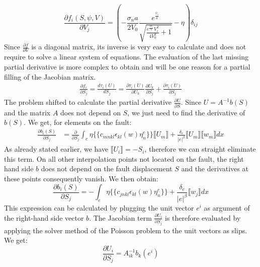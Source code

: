 \begin{equation}
\frac{\partial f_i(S,\psi,V)}{\partial V_j} = \left( -\frac{\sigma_na}{2V_0} \frac{e^{\frac{\psi_i}{a}}}{\sqrt{\frac{e^{\frac{2\psi_i}{a}}V_i^2}{4V_0^2}+1}}-\eta\right)\delta_{ij} 
\label{eq:partial_df_dV}
\end{equation}
Since $\frac{\partial f}{\partial V}$ is a diagonal matrix, its inverse is very easy to calculate and does not require to solve a linear system of equations. The evaluation of the last missing partial derivative is more complex to obtain and will be one reason for a partial filling of the Jacobian matrix.
\begin{align}
\label{eq:partialDerivative_df_dS}
\frac{\partial f_i}{\partial S_j} = \frac{d \tau_i(U)}{d S_j} = \frac{\partial \tau_i(U)}{\partial U_k}\frac{\partial U_k}{\partial S_j} + \frac{\partial \tau_i(U)}{\partial S_j}
\end{align}
The problem shifted to calculate the partial derivative $\frac{\partial U}{\partial S}$. Since $U = A^{-1}b(S)$ and the matrix $A$ does not depend on $S$, we just need to find the derivative of $b(S)$. We get, for elements on the fault:
\begin{align}
\frac{\partial b_i(S)}{\partial S_j} &= \frac{\partial }{\partial S_j}\int_e \eta \{\{c_{mnkl}\epsilon_{kl}(w)\eta_n^e\}\}\llbracket U_m \rrbracket + \frac{\delta_e}{|e|^\beta}\llbracket U_m \rrbracket\llbracket w_m \rrbracket dx
\end{align}
As already stated earlier, we have $\llbracket U_i \rrbracket = -S_i$, therefore we can straight eliminate this term. On all other interpolation points not located on the fault, the right hand side $b$ does not depend on the fault displacement $S$ and the derivatives at these points consequently vanish. We then obtain:
\begin{equation}
\frac{\partial b_i(S)}{\partial S_j} = -\int_e 
\eta  \{\{c_{jnkl}\epsilon_{kl}(w)\eta_n^e\}\} +
\frac{\delta_e}{|e|^\beta}\llbracket w_j \rrbracket dx
\end{equation}
This expression can be calculated by plugging the unit vector $e^i$ as argument of the right-hand side vector $b$. The Jacobian term $\frac{\partial U_i}{\partial S_j}$ is therefore evaluated by applying the solver method of the Poisson problem to the unit vectors as slips. We get:
\begin{equation}
\frac{\partial U_i}{\partial S_j} = A_{ik}^{-1}b_k(e^i)
\end{equation}

